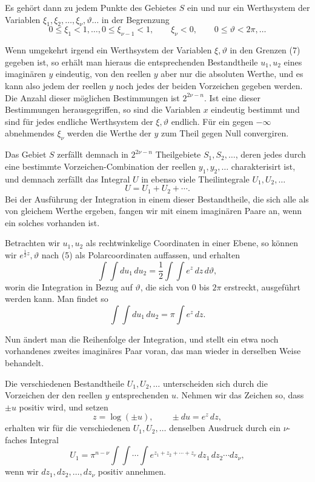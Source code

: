 \documentclass[11pt]{article}
\begin{document}
Es gehört dann zu jedem Punkte des Gebietes $S$ ein und nur ein Werthsystem der Variablen $\xi_1,\xi_2,\ldots,\xi_\nu,\vartheta\ldots$ in der Begrenzung
\begin{equation}
0\leq\xi_1<1,\ldots,
0\leq\xi_{\nu-1}<1,
\qquad
\xi_\nu<0,
\qquad
0\leq\vartheta<2\pi,\ldots
\tag{7}
\end{equation}

Wenn umgekehrt irgend ein Werthsystem der Variablen $\xi,\vartheta$ in den Grenzen (7) gegeben ist, so erhält man hieraus die entsprechenden Bestandtheile $u_1,u_2$ eines imaginären $y$ eindeutig, von den reellen $y$ aber nur die absoluten Werthe, und es kann also jedem der reellen $y$ noch jedes der beiden Vorzeichen gegeben werden. Die Anzahl dieser möglichen Bestimmungen ist $2^{2\nu-n}$. Ist eine dieser Bestimmungen herausgegriffen, so sind die Variablen $x$ eindeutig bestimmt und sind für jedes endliche Werthsystem der $\xi,\vartheta$ endlich. Für ein gegen $-\infty$ abnehmendes $\xi_\nu$ werden die Werthe der $y$ zum Theil gegen Null convergiren.

Das Gebiet $S$ zerfällt demnach in $2^{2\nu-n}$ Theilgebiete $S_1,S_2,\ldots$, deren jedes durch eine bestimmte Vorzeichen-Combination der reellen $y_1,y_2,\ldots$ charakterisirt ist, und demnach zerfällt das Integral $U$ in ebenso viele Theilintegrale $U_1,U_2,\ldots$
\[
U=U_1+U_2+\cdots.
\]
Bei der Ausführung der Integration in einem dieser Bestandtheile, die sich alle als von gleichem Werthe ergeben, fangen wir mit einem imaginären Paare an, wenn ein solches vorhanden ist.

Betrachten wir $u_1,u_2$ als rechtwinkelige Coordinaten in einer Ebene, so können wir $e^{\frac12 z},\vartheta$ nach (5) als Polarcoordinaten auffassen, und erhalten
\[
\int\!\int du_1\,du_2=\frac12\int\!\int e^z\,dz\,d\vartheta,
\]
worin die Integration in Bezug auf $\vartheta$, die sich von 0 bis $2\pi$ erstreckt, ausgeführt werden kann. Man findet so
\[
\int\!\int du_1\,du_2=\pi\int e^z\,dz.
\]

Nun ändert man die Reihenfolge der Integration, und stellt ein etwa noch vorhandenes zweites imaginäres Paar voran, das man wieder in derselben Weise behandelt.

Die verschiedenen Bestandtheile $U_1,U_2,\ldots$ unterscheiden sich durch die Vorzeichen der den reellen $y$ entsprechenden $u$. Nehmen wir das Zeichen so, dass $\pm u$ positiv wird, und setzen
\begin{equation}
z=\log(\pm u),
\qquad \pm du=e^z\,dz,
\tag{8}
\end{equation}
erhalten wir für die verschiedenen $U_1,U_2,\ldots$ denselben Ausdruck durch ein $\nu$-faches Integral
\begin{equation}
U_1=\pi^{n-\nu}\int\!\int\cdots\int e^{z_1+z_2+\cdots+z_\nu}\,dz_1\,dz_2\cdots dz_\nu,
\tag{9}
\end{equation}
wenn wir $dz_1,dz_2,\ldots,dz_\nu$ positiv annehmen.
\end{document}
